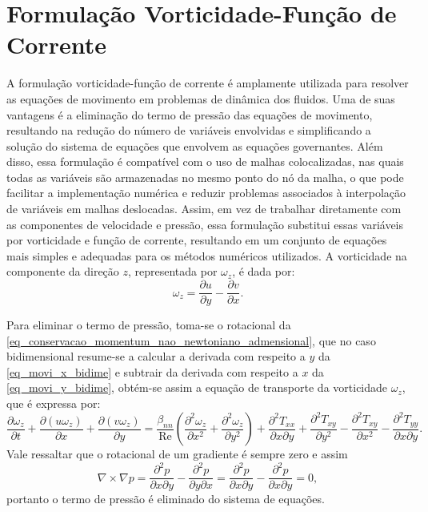 \section{Formulação Vorticidade-Função de Corrente}\label{Sec:Formulacao_Vorticidade_FuncaoCorrente}

A formulação vorticidade-função de corrente é amplamente utilizada para resolver as equações de movimento em problemas de dinâmica dos fluidos. Uma de suas vantagens é a eliminação do termo de pressão das equações de movimento, resultando na redução do número de variáveis envolvidas e simplificando a solução do sistema de equações que envolvem as equações governantes. Além disso, essa formulação é compatível com o uso de malhas colocalizadas, nas quais todas as variáveis são armazenadas no mesmo ponto do nó da malha, o que pode facilitar a implementação numérica e reduzir problemas associados à interpolação de variáveis em malhas deslocadas. Assim, em vez de trabalhar diretamente com as componentes de velocidade e pressão, essa formulação substitui essas variáveis por vorticidade e função de corrente, resultando em um conjunto de equações mais simples e adequadas para os métodos numéricos utilizados. A vorticidade na componente da direção $z$, representada por $\omega_{z}$, é dada por:
\begin{equation}
    \omega_{z} = \dfrac{\partial u}{\partial y} - \dfrac{\partial v}{\partial x}.
\end{equation}

Para eliminar o termo de pressão, toma-se o rotacional da \autoref{eq_conservacao_momentum_nao_newtoniano_admensional}, que no caso bidimensional resume-se a calcular a derivada com respeito a $y$ da \autoref{eq_movi_x_bidime} e subtrair da derivada com respeito a $x$ da \autoref{eq_movi_y_bidime}, obtém-se assim a equação de transporte da vorticidade $\omega_z$, que é expressa por:
\begin{equation}
    \dfrac{\partial \omega_{z}}{\partial t}+\dfrac{\partial(u\omega_{z})}{\partial x}+\dfrac{\partial(v\omega_{z})}{\partial y} = \dfrac{\beta_{nn}}{\operatorname{Re}}\left( \dfrac{\partial^{2}\omega_{z}}{\partial x^{2}} + \dfrac{\partial^{2}\omega_{z}}{\partial y^{2}} \right)+\dfrac{\partial^{2}T_{xx}}{\partial x\partial y}+\dfrac{\partial^{2}T_{xy}}{\partial y^{2}}-\dfrac{\partial^{2}T_{xy}}{\partial x^{2}}-\dfrac{\partial^{2}T_{yy}}{\partial x\partial y}.\label{eq_vorticity_wz}
\end{equation}
Vale ressaltar que o rotacional de um gradiente é sempre zero e assim $$\nabla \times \nabla p = \frac{\partial^2 p}{\partial x \partial y} - \frac{\partial^2 p}{\partial y \partial x} = \frac{\partial^2 p}{\partial x \partial y} - \frac{\partial^2 p}{\partial x \partial y} = 0,$$ portanto o termo de pressão é eliminado do sistema de equações.

